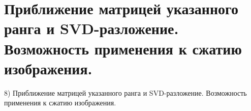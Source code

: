 \section{
 Приближение матрицей указанного ранга и SVD-разложение. Возможность применения к сжатию изображения.
}

8) Приближение матрицей указанного ранга и SVD-разложение. Возможность применения к сжатию изображения.

